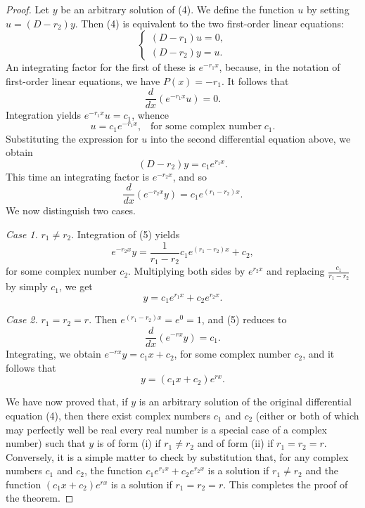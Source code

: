\begin{proof}
Let $y$ be an arbitrary solution of (4). We define the function $u$ by setting $u = (D - r_2)y$.  Then (4) is equivalent to the two first-order linear equations:
$$\left \{ \begin{array}{l}
(D - r_1)u = 0, \\
(D - r_2)y = u.
\end{array}
\right .
$$
An integrating factor for the first of these is $e^{-r_1 x}$, because, in the notation of first-order linear equations, we have $P(x) = -r_1$. It follows that
$$
\frac{d}{dx} (e^{-r_1 x} u) = 0 .
$$
Integration yields $e^{-r_1 x}u = c_1$, whence
$$
u = c_1 e^{-r_1 x}, \;\;\;\mbox{for some complex number}\; c_1.
$$
Substituting the expression for $u$ into the second differential equation above, we obtain
$$
(D - r_2)y = c_1e^{r_1 x}.
$$
This time an integrating factor is $e^{-r_2 x}$, and so
\begin{equation}
\frac{d}{dx} (e^{-r_2x} y) = c_1 e^{(r_1- r_2)x} .
\label{eq11.4.5}
\end{equation}
We now distinguish two cases.

\textit{Case 1.} $r_1 \neq r_2$. Integration of (5) yields
$$
e^{-r_2 x} y = \frac{1}{r_1 - r_2} c_1e^{(r_1 - r_2)x} + c_2,
$$
for some complex number $c_2$. Multiplying both sides by $e^{r_2x}$ and replacing $\frac{c_1}{r_1 - r_2}$ by simply $c_1$, we get
$$
y = c_1e^{r_1x} + c_2e^{r_2x}. 
$$

\textit{Case 2.} $r_1 = r_2 = r$. Then $e^{(r_1 - r_2)x} = e^0 = 1$, and (5) reduces to
$$
\frac{d}{dx} (e^{-rx} y) = c_1.
$$
Integrating, we obtain $e^{-rx}y = c_1 x + c_2$, for some complex number $c_2$, and it follows that
$$
y = (c_1x + c_2)e^{rx}.
$$

We have now proved that, if $y$ is an arbitrary solution of the original differential equation (4), then there exist complex numbers $c_1$ and $c_2$ (either or both of which may perfectly well be real every real number is a special
case of a complex number) such that $y$ is of form (i) if $r_1 \neq r_2$ and of form (ii) if $r_1 = r_2 = r$. Conversely, it is a simple matter to check by substitution that, for any complex numbers $c_1$ and $c_2$, the function $c_1e^{r_1x} + c_2e^{r_2x}$ is a solution if $r_1 \neq r_2$ and the function $(c_1x + c_2)e^{rx}$ is a solution if $r_1 = r_2 = r$. This completes the proof of the theorem.
\end{proof}


